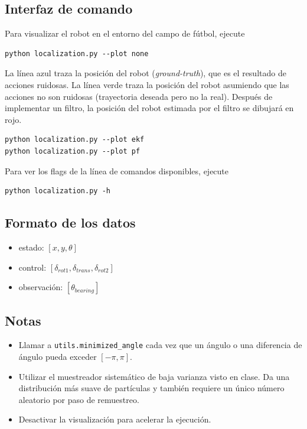 \documentclass[tp]{lcc}
\begin{document}
	\subsection{Interfaz de comando}

	Para visualizar el robot en el entorno del campo de fútbol, ejecute

\begin{lstlisting}[style=bash] 
python localization.py --plot none
\end{lstlisting}


	La línea {\color{blue} azul} traza la posición del robot (\emph{ground-truth}), que es el resultado de acciones ruidosas. La línea {\color{green} verde} traza la posición del robot asumiendo que las acciones no son ruidosas (trayectoria deseada pero no la real). Después de implementar un filtro, la posición del robot estimada por el filtro se dibujará en {\color{red} rojo}.
	
	
\begin{lstlisting}[style=bash] 
python localization.py --plot ekf
python localization.py --plot pf
\end{lstlisting}

	Para ver los flags de la línea de comandos disponibles, ejecute

\begin{lstlisting}[style=bash] 
python localization.py -h
\end{lstlisting}

	\subsection{Formato de los datos}

	\begin{itemize}
		\item estado: $[x,y,\theta]$
		\item control: $[\delta_{rot1},\delta_{trans},\delta_{rot2}]$
		\item observación: $[\theta_{bearing}]$
	\end{itemize}
	
	\subsection{Notas}
	\begin{itemize}
		\item Llamar a \lstinline[style=bash]{utils.minimized_angle} cada vez que un ángulo o una diferencia de ángulo pueda exceder $[-\pi, \pi]$.
		\item Utilizar el muestreador sistemático de baja varianza visto en clase. Da una distribución más suave de partículas y también requiere un único número aleatorio por paso de remuestreo.
		\item Desactivar la visualización para acelerar la ejecución.
	\end{itemize}
\end{document}
